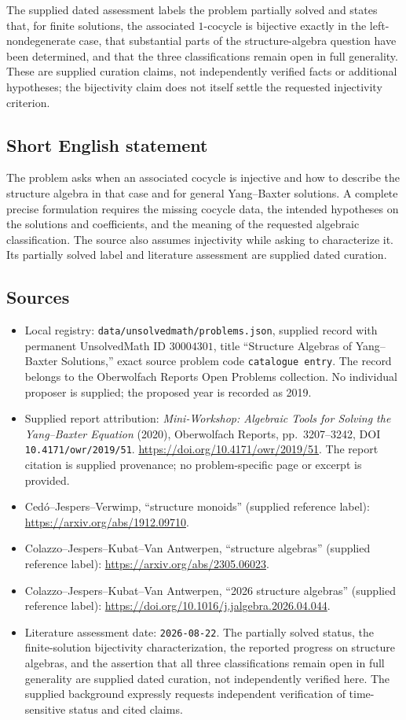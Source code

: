 \documentclass[11pt]{article}
\begin{document}
The supplied dated assessment labels the problem partially solved and states that, for finite solutions, the associated \(1\)-cocycle is bijective exactly in the left-nondegenerate case, that substantial parts of the structure-algebra question have been determined, and that the three classifications remain open in full generality. These are supplied curation claims, not independently verified facts or additional hypotheses; the bijectivity claim does not itself settle the requested injectivity criterion.
\subsection{Short English statement}
The problem asks when an associated cocycle is injective and how to describe the structure algebra in that case and for general Yang--Baxter solutions. A complete precise formulation requires the missing cocycle data, the intended hypotheses on the solutions and coefficients, and the meaning of the requested algebraic classification. The source also assumes injectivity while asking to characterize it. Its partially solved label and literature assessment are supplied dated curation.
\subsection{Sources}
\begin{itemize}
\item Local registry: \texttt{data/unsolvedmath/problems.json}, supplied record with permanent UnsolvedMath ID \(30004301\), title ``Structure Algebras of Yang--Baxter Solutions,'' exact source problem code \texttt{catalogue entry}. The record belongs to the Oberwolfach Reports Open Problems collection. No individual proposer is supplied; the proposed year is recorded as 2019.
\item Supplied report attribution: \emph{Mini-Workshop: Algebraic Tools for Solving the Yang--Baxter Equation} (2020), Oberwolfach Reports, pp.\ 3207--3242, DOI \texttt{10.4171/owr/2019/51}. \url{https://doi.org/10.4171/owr/2019/51}. The report citation is supplied provenance; no problem-specific page or excerpt is provided.
\item Ced\'o--Jespers--Verwimp, ``structure monoids'' (supplied reference label): \url{https://arxiv.org/abs/1912.09710}.
\item Colazzo--Jespers--Kubat--Van Antwerpen, ``structure algebras'' (supplied reference label): \url{https://arxiv.org/abs/2305.06023}.
\item Colazzo--Jespers--Kubat--Van Antwerpen, ``2026 structure algebras'' (supplied reference label): \url{https://doi.org/10.1016/j.jalgebra.2026.04.044}.
\item Literature assessment date: \texttt{2026-08-22}. The partially solved status, the finite-solution bijectivity characterization, the reported progress on structure algebras, and the assertion that all three classifications remain open in full generality are supplied dated curation, not independently verified here. The supplied background expressly requests independent verification of time-sensitive status and cited claims.
\end{itemize}
\end{document}
